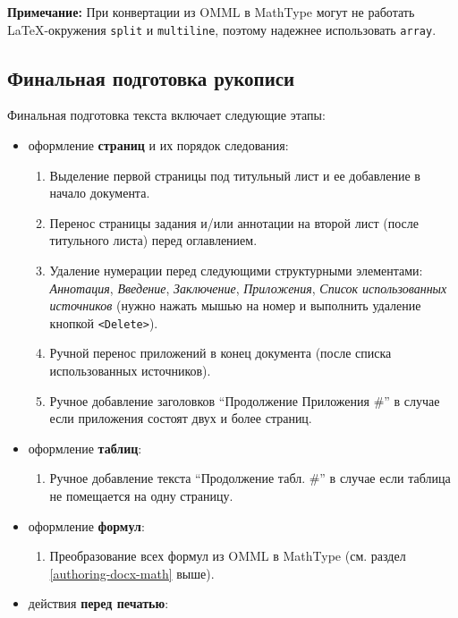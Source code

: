 \documentclass[
  a4paper,
]{book}
\providecommand{\tightlist}{%
  \setlength{\itemsep}{0pt}\setlength{\parskip}{0pt}}
\theoremstyle{definition}
\theoremstyle{definition}
\theoremstyle{definition}
\theoremstyle{definition}
\theoremstyle{remark}
\begin{document}
\textbf{Примечание:} При конвертации из OMML в MathType могут не работать LaTeX-окружения \texttt{split} и \texttt{multiline}, поэтому надежнее использовать \texttt{array}.

\subsection{Финальная подготовка рукописи}\label{authoring-docx-final}

Финальная подготовка текста включает следующие этапы:

\begin{itemize}
\item
  оформление \textbf{страниц} и их порядок следования:

  \begin{enumerate}
  \def\labelenumi{\arabic{enumi}.}
  \tightlist
  \item
    Выделение первой страницы под титульный лист и ее добавление в начало документа.
  \item
    Перенос страницы задания и/или аннотации на второй лист (после титульного листа) перед оглавлением.
  \item
    Удаление нумерации перед следующими структурными элементами: \emph{Аннотация}, \emph{Введение}, \emph{Заключение}, \emph{Приложения}, \emph{Список использованных источников} (нужно нажать мышью на номер и выполнить удаление кнопкой \texttt{\textless{}Delete\textgreater{}}).
  \item
    Ручной перенос приложений в конец документа (после списка использованных источников).
  \item
    Ручное добавление заголовков ``Продолжение Приложения \#'' в случае если приложения состоят двух и более страниц.
  \end{enumerate}
\item
  оформление \textbf{таблиц}:

  \begin{enumerate}
  \def\labelenumi{\arabic{enumi}.}
  \tightlist
  \item
    Ручное добавление текста ``Продолжение табл. \#'' в случае если таблица не помещается на одну страницу.
  \end{enumerate}
\item
  оформление \textbf{формул}:

  \begin{enumerate}
  \def\labelenumi{\arabic{enumi}.}
  \tightlist
  \item
    Преобразование всех формул из OMML в MathType (см. раздел \ref{authoring-docx-math} выше).
  \end{enumerate}
\item
  действия \textbf{перед печатью}:


\end{itemize}
\end{document}
